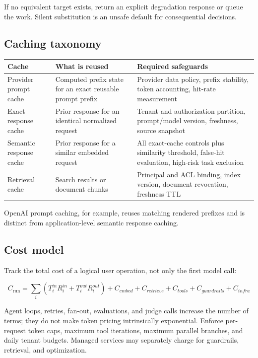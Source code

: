 \documentclass[10pt]{article}
\begin{document}
If no equivalent target exists, return an explicit degradation response or queue the work. Silent substitution is an unsafe default for consequential decisions.

\subsection{Caching taxonomy}

\begin{tabularx}{\textwidth}{P{0.22\textwidth} Y Y}
\toprule
\textbf{Cache} & \textbf{What is reused} & \textbf{Required safeguards} \\
\midrule
Provider prompt cache & Computed prefix state for an exact reusable prompt prefix & Provider data policy, prefix stability, token accounting, hit-rate measurement \\
Exact response cache & Prior response for an identical normalized request & Tenant and authorization partition, prompt/model version, freshness, source snapshot \\
Semantic response cache & Prior response for a similar embedded request & All exact-cache controls plus similarity threshold, false-hit evaluation, high-risk task exclusion \\
Retrieval cache & Search results or document chunks & Principal and ACL binding, index version, document revocation, freshness TTL \\
\bottomrule
\end{tabularx}

OpenAI prompt caching, for example, reuses matching rendered prefixes and is distinct from application-level semantic response caching.\cite{openai-cache}

\subsection{Cost model}

Track the total cost of a logical user operation, not only the first model call:

\[
C_{\mathrm{run}} = \sum_i (T^{in}_i R^{in}_i + T^{out}_i R^{out}_i) + C_{embed} + C_{retrieve} + C_{tools} + C_{guardrails} + C_{infra}
\]

Agent loops, retries, fan-out, evaluations, and judge calls increase the number of terms; they do not make token pricing intrinsically exponential. Enforce per-request token caps, maximum tool iterations, maximum parallel branches, and daily tenant budgets. Managed services may separately charge for guardrails, retrieval, and optimization.\cite{bedrock-pricing}
\end{document}
